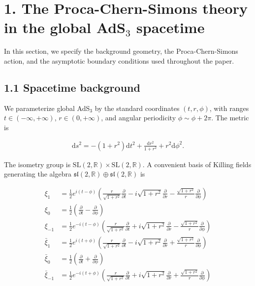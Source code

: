 \section{\texorpdfstring{1. The Proca-Chern-Simons theory in the global AdS$_3$ spacetime}{1. The Proca-Chern-Simons theory in the global AdS3 spacetime}}\label{sec:proca-cs-global-ads3}

In this section, we specify the background geometry, the Proca-Chern-Simons action, and the asymptotic boundary conditions used throughout the paper.

\subsection{1.1 Spacetime background}\label{subsec:proca-cs-spacetime-background}

We parameterize global AdS$_3$ by the standard coordinates $(t, r, \phi)$, with ranges $t \in (-\infty, +\infty)$, $r \in (0, +\infty)$, and angular periodicity $\phi \sim \phi + 2\pi$. The metric is

\begin{align}
\mathrm{d}s^2 = -(1+r^2)\mathrm{d}t^2 + \frac{\mathrm{d}r^2}{1+r^2} + r^2 \mathrm{d}\phi^2.
\end{align}

The isometry group is $\mathrm{SL}(2, \mathbb{R}) \times \mathrm{SL}(2, \mathbb{R})$. A convenient basis of Killing fields generating the algebra $\mathfrak{sl}(2, \mathbb{R}) \oplus \mathfrak{sl}(2, \mathbb{R})$ is

\begin{align}
\xi _{1} & =\frac{1}{2}e^{i(t-\phi)}\left(\frac{r}{\sqrt{ 1+r^{2} }} \frac{\partial}{\partial t}-i\sqrt{ 1+r^{2} } \frac{\partial}{\partial r}-\frac{\sqrt{ 1+r^{2} }}{r} \frac{\partial}{\partial \phi}\right) \\
\xi _{0} & =\frac{1}{2}\left(\frac{\partial}{\partial t}-\frac{\partial}{\partial \phi}\right) \\
\xi _{-1} & =\frac{1}{2}e^{-i(t-\phi)}\left(\frac{r}{\sqrt{ 1+r^{2} }} \frac{\partial}{\partial t}+i\sqrt{ 1+r^{2} } \frac{\partial}{\partial r}-\frac{\sqrt{ 1+r^{2} }}{r} \frac{\partial}{\partial \phi}\right) \\
\bar{\xi}_{1} & =\frac{1}{2}e^{i(t+\phi)}\left(\frac{r}{\sqrt{ 1+r^{2} }} \frac{\partial}{\partial t}-i\sqrt{ 1+r^{2} } \frac{\partial}{\partial r}+\frac{\sqrt{ 1+r^{2} }}{r} \frac{\partial}{\partial \phi}\right) \\
\bar{\xi}_{0} & =\frac{1}{2}\left(\frac{\partial}{\partial t}+\frac{\partial}{\partial \phi}\right) \\
\bar{\xi}_{-1} & =\frac{1}{2}e^{-i(t+\phi)}\left(\frac{r}{\sqrt{ 1+r^{2} }} \frac{\partial}{\partial t}+i\sqrt{ 1+r^{2} } \frac{\partial}{\partial r}+\frac{\sqrt{ 1+r^{2} }}{r} \frac{\partial}{\partial \phi}\right)
\end{align}

